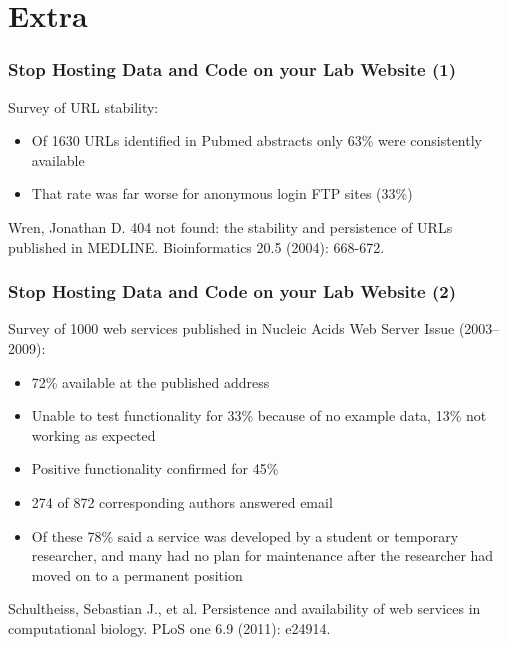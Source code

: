 \documentclass[slidestop]{beamer}
\begin{document}
\section*{Extra}

\extrapagetemplate
\begin{frame}
  \frametitle{Stop Hosting Data and Code on your Lab Website (1)}
  Survey of URL stability:
  \begin{itemize}
    \item Of 1630 URLs identified in Pubmed abstracts only 63\% were
      consistently available
    \item That rate was far worse for anonymous login FTP sites (33\%)
  \end{itemize}
  Wren, Jonathan D. 404 not found: the stability and persistence of URLs
  published in MEDLINE. Bioinformatics 20.5 (2004): 668-672.
\end{frame}

\extrapagetemplate
\begin{frame}
  \frametitle{Stop Hosting Data and Code on your Lab Website (2)}
  Survey of 1000 web services published in Nucleic Acids Web
  Server Issue (2003--2009):
  \begin{itemize}
    \item 72\% available at the published address
    \item Unable to test functionality for 33\% because of no example data,
      13\% not working as expected
    \item Positive functionality confirmed for 45\%
    \item 274 of 872 corresponding authors answered email
    \item Of these 78\% said a service was developed by a student or temporary
      researcher, and many had no plan for maintenance after the researcher
      had moved on to a permanent position
  \end{itemize}
  Schultheiss, Sebastian J., et al. Persistence and availability of web
  services in computational biology. PLoS one 6.9 (2011): e24914.
\end{frame}
\end{document}
